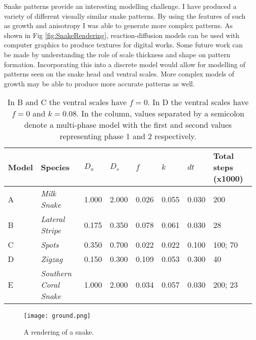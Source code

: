 Snake patterns provide an interesting modelling challenge. I have produced a variety of different visually similar snake patterns. By using the features of \ProgramName{} such as growth and anisotropy I was able to generate more complex patterns. As shown in Fig \ref{fig:SnakeRendering}, reaction-diffusion models can be used with computer graphics to produce textures for digital works. Some future work can be made by understanding the role of scale thickness and shape on pattern formation. Incorporating this into a discrete model would allow for modelling of patterns seen on the snake head and ventral scales. More complex models of growth may be able to produce more accurate patterns as well.

\begin{table}[h]
	\centering
	\begin{tabular}{|l|l|l|l|l|l|l|l|}
	\hline
	Model & Species                      &$D_a$ &$D_s$ &$f$    &$k$   &$dt$ &Total steps (x1000)\\ \hline 
	A     &\textit{Milk Snake}		     &1.000 &2.000 &0.026 &0.055 &0.030 &200                \\ \hline
	B     &\textit{Lateral Stripe}       &0.175 &0.350 &0.078 &0.061 &0.030 &28                 \\ \hline
	C     &\textit{Spots}                &0.350 &0.700 &0.022 &0.022 &0.100 &100; 70            \\ \hline
	D     &\textit{Zigzag}               &0.150 &0.300 &0.109 &0.053 &0.300 &40                 \\ \hline
	E     &\textit{Southern Coral Snake} &1.000 &2.000 &0.034 &0.057 &0.030 &200; 23            \\ \hline
	\end{tabular}
	\caption {In B and C the ventral scales have $f=0$. In D the ventral scales have $f=0$ and $k=0.08$. In the  column, values separated by a semicolon denote a multi-phase model with the first and second values representing phase 1 and 2 respectively.}
	\label{tab:snakeParameters}
\end{table}

\begin{figure}[p]
	\centering
	\texttt{[image: ground.png]}
	\caption{A rendering of a snake.}
	\label{fig:Snake6}
\end{figure}